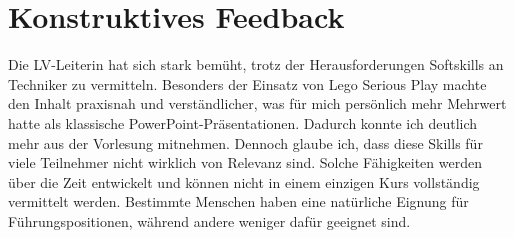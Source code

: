 \section{Konstruktives Feedback}

Die LV-Leiterin hat sich stark bemüht, trotz der Herausforderungen Softskills an Techniker zu vermitteln. Besonders der Einsatz von Lego Serious Play machte den Inhalt praxisnah und verständlicher, was für mich persönlich mehr Mehrwert hatte als klassische PowerPoint-Präsentationen. Dadurch konnte ich deutlich mehr aus der Vorlesung mitnehmen. Dennoch glaube ich, dass diese Skills für viele Teilnehmer nicht wirklich von Relevanz sind. Solche Fähigkeiten werden über die Zeit entwickelt und können nicht in einem einzigen Kurs vollständig vermittelt werden. Bestimmte Menschen haben eine natürliche Eignung für Führungspositionen, während andere weniger dafür geeignet sind.

\newpage